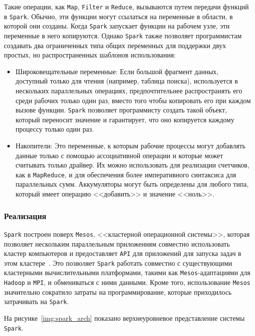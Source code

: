 Такие операции, как \texttt{Map}, \texttt{Filter} и \texttt{Reduce}, вызываются путем передачи функций в \texttt{Spark}.
Обычно, эти функции могут ссылаться на переменные в области, в которой они созданы.
Когда \texttt{Spark} запускает функции на рабочем узле, эти переменные в него копируются. 
Однако \texttt{Spark} также позволяет программистам создавать два ограниченных типа общих переменных для поддержки двух простых, но распространенных шаблонов использования:
\begin{itemize}
  \item Широковещательные переменные: Если большой фрагмент данных, доступный только для чтения (например, таблица поиска), используется в нескольких параллельных операциях, предпочтительнее распространять его среди рабочих только один раз, вместо того чтобы копировать его при каждом вызове функции. 
    \texttt{Spark} позволяет программисту создать такой объект, который переносит значение и гарантирует, что оно копируется каждому процессу только один раз.
  \item Накопители: Это переменные, к которым рабочие процессы могут добавлять данные только с помощью ассоциативной операции и которые может считывать только драйвер. 
    Их можно использовать для реализации счетчиков, как в \texttt{MapReduce}, и для обеспечения более императивного синтаксиса для параллельных сумм. 
    Аккумуляторы могут быть определены для любого типа, который имеет операцию <<добавить>> и значение <<ноль>>.
\end{itemize} 

\subsubsection{Реализация}

\texttt{Spark} построен поверх \texttt{Mesos}, <<кластерной операционной системы>>, которая позволяет нескольким параллельным приложениям совместно использовать кластер компьютеров и предоставляет \texttt{API} для приложений для запуска задач в этом кластере~\cite{266915}.
Это позволяет \texttt{Spark} работать совместно с существующими кластерными вычислительными платформами, такими как \texttt{Mesos}-адаптациями для \texttt{Hadoop} и \texttt{MPI}, и обмениваться с ними данными. 
Кроме того, использование \texttt{Mesos} значительно сократило затраты на программирование, которые приходилось затрачивать на \texttt{Spark}.

На рисунке~\ref{img:spark_arch} показано верхнеуровневое представление системы \texttt{Spark}.

